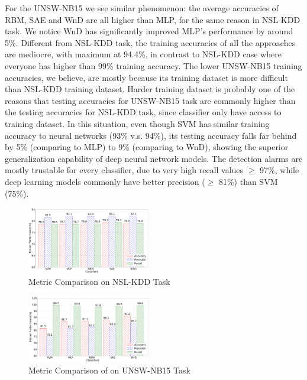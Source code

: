 For the UNSW-NB15 we see similar phenomenon: the average accuracies of RBM, SAE and WnD are
all higher than MLP, for the same reason in NSL-KDD task.
We notice WnD has significantly improved MLP's performance by around 5\%.
Different from NSL-KDD task, the training accuracies of all the approaches are mediocre,
with maximum at 94.4\%, in contrast to NSL-KDD case where everyone has higher than 99\% training accuracy.
The lower UNSW-NB15 training accuracies, we believe, are mostly because its training dataset
is more difficult than NSL-KDD training dataset.
Harder training dataset is probably one of the reasons that testing accuracies for UNSW-NB15 task
are commonly higher than the testing accuracies for NSL-KDD task,
since classifier only have access to training dataset.
In this situation, even though SVM has similar training accuracy to neural networks (93\% v.s. 94\%),
its testing accuracy falls far behind by 5\% (comparing to MLP) to 9\% (comparing to WnD),
showing the superior generalization capability of deep neural network models.
The detection alarms are mostly trustable for every classifier,
due to very high recall values $\geq$ 97\%,
while deep learning models commonly have better precision ($\geq$ 81\%) than SVM (75\%).

\begin{figure}[h]
    \centering
    \includegraphics[width=0.48\textwidth]{figures/comp_accuracy_nsl.pdf}
    \caption{Metric Comparison on NSL-KDD Task}
    \label{Fig:CompAccuracyNSL}
\end{figure}

\begin{figure}[h]
    \centering
    \includegraphics[width=0.48\textwidth]{figures/comp_accuracy_unsw.pdf}
    \caption{Metric Comparison of on UNSW-NB15 Task}
    \label{Fig:CompAccuracyUNSW}
\end{figure}

